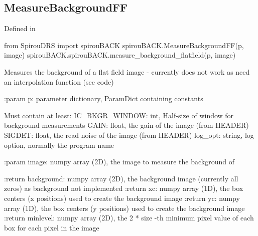 \noindent\begin{minipage}{\textwidth}
\subsection{MeasureBackgroundFF}

Defined in \spirouBACK{}

\begin{pythonbox}
from SpirouDRS import spirouBACK
spirouBACK.MeasureBackgroundFF(p, image)
spirouBACK.spirouBACK.measure_background_flatfield(p, image)
\end{pythonbox}

\begin{pythondocstring}
Measures the background of a flat field image - currently does not work
as need an interpolation function (see code)

:param p: parameter dictionary, ParamDict containing constants

        Must contain at least:
            IC_BKGR_WINDOW: int, Half-size of window for background
                            measurements
            GAIN: float, the gain of the image (from HEADER)
            SIGDET: float, the read noise of the image (from HEADER)
            log_opt: string, log option, normally the program name

:param image: numpy array (2D), the image to measure the background of

:return background: numpy array (2D), the background image (currently all
                    zeros) as background not implemented
:return xc: numpy array (1D), the box centers (x positions) used to create
            the background image
:return yc: numpy array (1D), the box centers (y positions) used to create
            the background image
:return minlevel: numpy array (2D), the 2 * size -th minimum pixel value
                  of each box for each pixel in the image
\end{pythondocstring}
\end{minipage}

